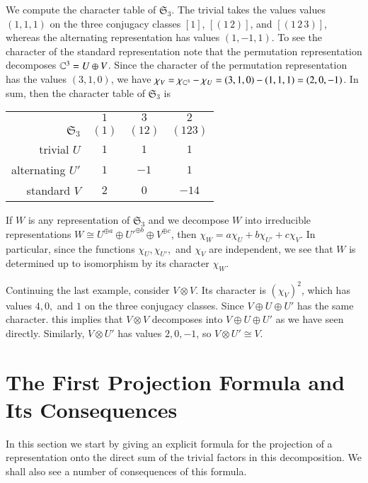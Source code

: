 \begin{example}
    We compute the character table of $\mathfrak{S}_3$. The trivial takes the values values $(1,1,1)$ on the three conjugacy classes $[1]$, $[(1\,2)]$, and $[(1\,2\,3)]$, whereas the alternating representation has values $(1,-1,1)$. To see the character of the standard representation note that the permutation representation decomposes $\mathbb C^3 = U\oplus V$. Since the character of the permutation representation has the values $(3,1,0)$, we have $\chi_V = \chi_{\mathbb C^3} - \chi_U = (3,1,0) - (1,1,1) = (2,0,-1)$. In sum, then the character table of $\mathfrak{S}_3$ is 
    \begin{table}[H]
        \centering
        \begin{tabular}{r|ccc}
            & $1$ & $3$ & $2$ \\
            $\mathfrak{S}_3$ & $(1)$ & $(12)$ & $(123)$ \\ \hline
            trivial $U$ & $1$ & $1$ & $1$ \\ 
            alternating $U'$ & $1$ & $-1$ & $1$ \\
            standard $V$ & $2$ & $0$ & $-14$ \\
        \end{tabular}
    \end{table}
    If $W$ is any representation of $\mathfrak{S}_3$ and we decompose $W$ into irreducible representations $W \cong U^{\oplus a}\oplus {U'}^{\oplus b}\oplus V^{\oplus c}$, then $\chi_W = a\chi_U + b\chi_{U'} + c\chi_V$. In particular, since the functions $\chi_U,\chi_{U'},$ and $\chi_V$ are independent, we see that $W$ is determined up to isomorphism by its character $\chi_W$.
\end{example}

Continuing the last example, consider $V\otimes V$. Its character is $(\chi_V)^2$, which has values $4, 0,$ and $1$ on the three conjugacy classes. Since $V\oplus U\oplus U'$ has the same character. this implies that $V\otimes V$ decomposes into $V\oplus U\oplus U'$ as we have seen directly. Similarly, $V\otimes U'$ has values $2, 0, -1$, so $V\otimes U'\cong V$.

\section{The First Projection Formula and Its Consequences}

In this section we start by giving an explicit formula for the projection of a representation onto the direct sum of the trivial factors in this decomposition. We shall also see a number of consequences of this formula.

